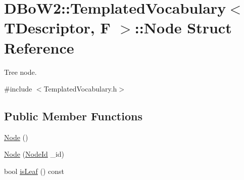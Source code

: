 \hypertarget{struct_d_bo_w2_1_1_templated_vocabulary_1_1_node}{}\section{D\+Bo\+W2\+:\+:Templated\+Vocabulary$<$ T\+Descriptor, F $>$\+:\+:Node Struct Reference}
\label{struct_d_bo_w2_1_1_templated_vocabulary_1_1_node}


Tree node.  




{\ttfamily \#include $<$Templated\+Vocabulary.\+h$>$}

\subsection*{Public Member Functions}
\begin{DoxyCompactItemize}
\item 
\mbox{\hyperlink{struct_d_bo_w2_1_1_templated_vocabulary_1_1_node_a1339ee00108c4c652cd1ca55a37c3fd3}{Node}} ()
\item 
\mbox{\hyperlink{struct_d_bo_w2_1_1_templated_vocabulary_1_1_node_a9f1fcb620025ba6103a47e5c2b169cd6}{Node}} (\mbox{\hyperlink{namespace_d_bo_w2_a3a0fa9c50c0df508759362d6204566f2}{Node\+Id}} \+\_\+id)
\item 
bool \mbox{\hyperlink{struct_d_bo_w2_1_1_templated_vocabulary_1_1_node_a050a0ee173dd58475dd2ab84e6f215e8}{is\+Leaf}} () const
\end{DoxyCompactItemize}
